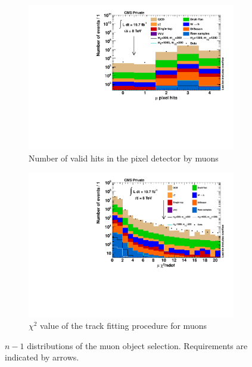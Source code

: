 \begin{figure}[!htb]
  \ContinuedFloat
  \centering
  \begin{subfigure}[b]{0.495\textwidth}
    \centering
    \includegraphics[width=\textwidth]{plots/nMuon_ValidPixelHitsCm.pdf}
    \caption{Number of valid hits in the pixel detector by muons\label{fig:muo_validpixelhits}}
  \end{subfigure}
  \begin{subfigure}[b]{0.495\textwidth}
    \centering
    \includegraphics[width=\textwidth]{plots/nMuon_TrkChi.pdf}
    \caption{$\chi^2$ value of the track fitting procedure for muons\label{fig:muo_chi2}}
  \end{subfigure}

  \caption{$n - 1$ distributions of the muon object selection. Requirements are indicated by arrows.}
  \label{fig:n-1}
\end{figure}




